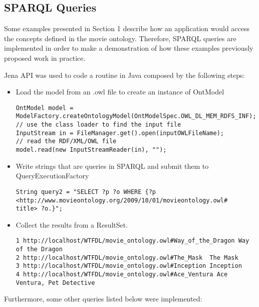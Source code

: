\subsection{SPARQL Queries}
Some examples presented in Section 1 describe how an application would access the concepts defined in the movie ontology.
Therefore, SPARQL queries are implemented in order to make a demonstration of how these examples previously proposed work in practice.

Jena API was used to code a routine in Java composed by the following steps:

\begin{itemize}
  \item Load the model from an .owl file to create an instance of OntModel
\begin{lstlisting}
OntModel model = ModelFactory.createOntologyModel(OntModelSpec.OWL_DL_MEM_RDFS_INF);
// use the class loader to find the input file
InputStream in = FileManager.get().open(inputOWLFileName);
// read the RDF/XML/OWL file
model.read(new InputStreamReader(in), "");
\end{lstlisting}

  \item Write strings that are queries in SPARQL and submit them to QueryExecutionFactory
\begin{lstlisting}
String query2 = "SELECT ?p ?o WHERE {?p <http://www.movieontology.org/2009/10/01/movieontology.owl#
title> ?o.}";
\end{lstlisting}

  \item Collect the results from a ResultSet.
\begin{verbatim}
1 http://localhost/WTFDL/movie_ontology.owl#Way_of_the_Dragon Way of the Dragon 
2 http://localhost/WTFDL/movie_ontology.owl#The_Mask  The Mask  
3 http://localhost/WTFDL/movie_ontology.owl#Inception Inception 
4 http://localhost/WTFDL/movie_ontology.owl#Ace_Ventura Ace Ventura, Pet Detective  
\end{verbatim}

\end{itemize}

Furthermore, some other queries listed below were implemented:

